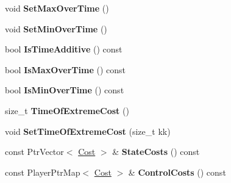 \begin{DoxyCompactItemize}
\item 
void {\bfseries Set\+Max\+Over\+Time} ()\hypertarget{classilqgames_1_1_player_cost_ab348e49baf8f7e580914a17ce79f175e}{}\label{classilqgames_1_1_player_cost_ab348e49baf8f7e580914a17ce79f175e}

\item 
void {\bfseries Set\+Min\+Over\+Time} ()\hypertarget{classilqgames_1_1_player_cost_a00b0e84c89dfef9375d3ee17c9b8e4ef}{}\label{classilqgames_1_1_player_cost_a00b0e84c89dfef9375d3ee17c9b8e4ef}

\item 
bool {\bfseries Is\+Time\+Additive} () const \hypertarget{classilqgames_1_1_player_cost_a0a7a783fc2d25d16b20d8ecb232de147}{}\label{classilqgames_1_1_player_cost_a0a7a783fc2d25d16b20d8ecb232de147}

\item 
bool {\bfseries Is\+Max\+Over\+Time} () const \hypertarget{classilqgames_1_1_player_cost_a1a07ef47dadd7821b19357062d74ab79}{}\label{classilqgames_1_1_player_cost_a1a07ef47dadd7821b19357062d74ab79}

\item 
bool {\bfseries Is\+Min\+Over\+Time} () const \hypertarget{classilqgames_1_1_player_cost_aff2f1b2d48982fa767c8cd9ad770710f}{}\label{classilqgames_1_1_player_cost_aff2f1b2d48982fa767c8cd9ad770710f}

\item 
size\+\_\+t {\bfseries Time\+Of\+Extreme\+Cost} ()\hypertarget{classilqgames_1_1_player_cost_a1bacfa4c40e98588431d67e1f4b96919}{}\label{classilqgames_1_1_player_cost_a1bacfa4c40e98588431d67e1f4b96919}

\item 
void {\bfseries Set\+Time\+Of\+Extreme\+Cost} (size\+\_\+t kk)\hypertarget{classilqgames_1_1_player_cost_ab1d9aea9b9f86f5fbc785cd8981ccd81}{}\label{classilqgames_1_1_player_cost_ab1d9aea9b9f86f5fbc785cd8981ccd81}

\item 
const Ptr\+Vector$<$ \hyperlink{classilqgames_1_1_cost}{Cost} $>$ \& {\bfseries State\+Costs} () const \hypertarget{classilqgames_1_1_player_cost_a16a676ec8d145d97d555cbebe79ac5fd}{}\label{classilqgames_1_1_player_cost_a16a676ec8d145d97d555cbebe79ac5fd}

\item 
const Player\+Ptr\+Map$<$ \hyperlink{classilqgames_1_1_cost}{Cost} $>$ \& {\bfseries Control\+Costs} () const \hypertarget{classilqgames_1_1_player_cost_ad809161f85e1d22af874e2cd5278a753}{}\label{classilqgames_1_1_player_cost_ad809161f85e1d22af874e2cd5278a753}


\end{DoxyCompactItemize}
